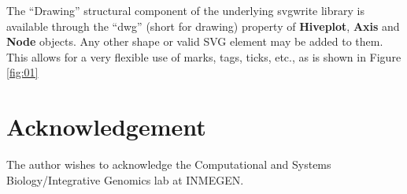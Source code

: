 \documentclass{bioinfo}
\begin{document}
The ``Drawing'' structural component of the underlying svgwrite
library is available through the ``dwg'' (short for drawing) property
of {\bfseries Hiveplot}, {\bfseries Axis} and {\bfseries Node}
objects. Any other shape or valid SVG element may be added to them.
This allows for a very flexible use of marks, tags, ticks, etc., as is
shown in Figure \ref{fig:01}




\section*{Acknowledgement}
The author wishes to acknowledge the Computational and Systems
Biology/Integrative Genomics lab at INMEGEN.


%
%
%
%

\begin{thebibliography}{}


\end{thebibliography}

%
%
%
%


% 







% 
\end{document}
